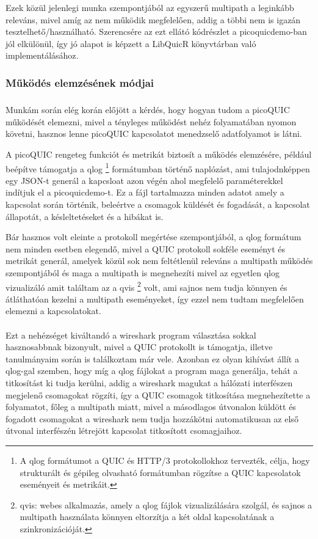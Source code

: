 \documentclass[a4paper,oneside]{article}
\begin{document}
Ezek közül jelenlegi munka szempontjából az egyszerű multipath a leginkább releváns,
mivel amíg az nem működik megfelelően, addig a többi nem is igazán tesztelhető/használható.
Szerencsére az ezt ellátó kódrészlet a picoquicdemo-ban jól elkülönül, így jó alapot is képzett
a LibQuicR könyvtárban való implementálásához.

\subsubsection{Működés elemzésének módjai}

\subparagraph{}

Munkám során elég korán előjött a kérdés, hogy hogyan tudom a picoQUIC működését elemezni, mivel
a tényleges működést nehéz folyamatában nyomon követni, hasznos lenne picoQUIC kapcsolatot menedzselő adatfolyamot is látni.

A picoQUIC rengeteg funkciót és metrikát biztosít a működés elemzésére, 
például beépítve támogatja a qlog \footnote{A qlog formátumot a QUIC és 
HTTP/3 protokollokhoz tervezték, célja, hogy strukturált és gépileg 
olvasható formátumban rögzítse a QUIC kapcsolatok eseményeit és metrikáit.}
formátumban történő naplózást, ami tulajodnképpen egy JSON-t generál a kapcsloat azon végén ahol megfelelő paraméterekkel indítjuk el a picoquicdemo-t.
Ez a fájl tartalmazza minden adatot amely a kapcsolat során történik, beleértve a csomagok küldését és fogadását,
a kapcsolat állapotát, a késleltetéseket és a hibákat is.

Bár hasznos volt eleinte a protokoll megértése szempontjából, a qlog formátum nem minden esetben elegendő, mivel a QUIC protokoll
sokféle eseményt és metrikát generál, amelyek közül sok nem feltétlenül releváns a 
multipath működés szempontjából és maga a multipath is megnehezíti mivel az egyetlen 
qlog vizualizáló amit találtam az a qvis \footnote{qvis: webes alkalmazás, amely a qlog 
fájlok vizualizálására szolgál, és sajnos a multipath használata könnyen eltorzítja a két oldal 
kapcsolatának a szinkronizációját.} volt, ami sajnos nem tudja könnyen és átláthatóan kezelni a multipath eseményeket, 
így ezzel nem tudtam megfelelően elemezni a kapcsolatokat.

\paragraph{}
Ezt a nehézséget kiváltandó a wireshark program választása sokkal hasznosabbnak bizonyult, mivel
a QUIC protokollt is támogatja, illetve tanulmányaim során is találkoztam már vele. 
Azonban ez olyan kihívást állít a qlog-gal szemben, hogy míg a 
qlog fájlokat a program maga generálja, tehát a titkosítást ki tudja kerülni, 
addig a wireshark magukat a hálózati interfészen megjelenő csomagokat rögzíti, 
így a QUIC csomagok titkosítása megnehezítette a folyamatot, főleg a multipath 
miatt, mivel a másodlagos útvonalon küldött és fogadott csomagokat a wireshark 
nem tudja hozzákötni automatikusan az első útvonal interfészén létrejött kapcsolat titkosított csomagjaihoz.
\end{document}
